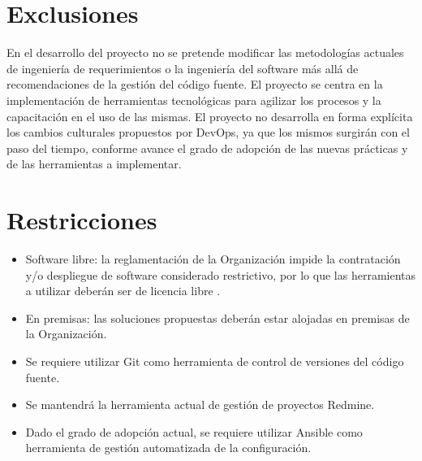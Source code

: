 \section{Exclusiones}

En el desarrollo del proyecto no se pretende modificar las
metodologías actuales de ingeniería de requerimientos o la ingeniería
del software más allá de recomendaciones de la gestión del código
fuente. El proyecto se centra en la implementación de herramientas
tecnológicas para agilizar los procesos y la capacitación en el uso de
las mismas. El proyecto no desarrolla en forma explícita los cambios
culturales propuestos por DevOps, ya que los mismos surgirán con el
paso del tiempo, conforme avance el grado de adopción de las nuevas
prácticas y de las herramientas a implementar.

\section{Restricciones}

\begin{itemize}
\item Software libre: la reglamentación de la Organización impide la
  contratación y/o despliegue de software considerado restrictivo, por
  lo que las herramientas a utilizar deberán ser de licencia libre
  \cite{unllibre}.
\item En premisas: las soluciones propuestas deberán estar alojadas en
  premisas de la Organización.
\item Se requiere utilizar Git como herramienta de control de
  versiones del código fuente.
\item Se mantendrá la herramienta actual de gestión de proyectos
  Redmine.
\item Dado el grado de adopción actual, se requiere utilizar Ansible
  como herramienta de gestión automatizada de la configuración.
\end{itemize}
